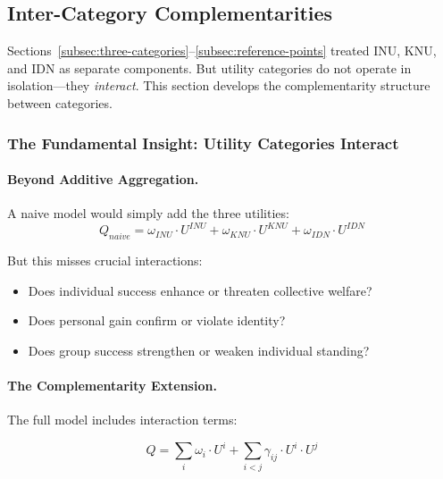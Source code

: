 \subsection{Inter-Category Complementarities}
\label{subsec:inter-category-complementarities}


Sections~\ref{subsec:three-categories}--\ref{subsec:reference-points} treated 
INU, KNU, and IDN as separate components. But utility categories do not operate 
in isolation---they \emph{interact}. This section develops the complementarity 
structure between categories.

\subsubsection{The Fundamental Insight: Utility Categories Interact}

\paragraph{Beyond Additive Aggregation.}
A naive model would simply add the three utilities:
\begin{equation}
Q_{naive} = \omega_{INU} \cdot U^{INU} + \omega_{KNU} \cdot U^{KNU} + \omega_{IDN} \cdot U^{IDN}
\end{equation}

But this misses crucial interactions:
\begin{itemize}
\item Does individual success enhance or threaten collective welfare?
\item Does personal gain confirm or violate identity?
\item Does group success strengthen or weaken individual standing?
\end{itemize}

\paragraph{The Complementarity Extension.}
The full model includes interaction terms:

\begin{equation}
\boxed{
Q = \sum_{i} \omega_i \cdot U^i + \sum_{i < j} \gamma_{ij} \cdot U^i \cdot U^j
}
\label{eq:complementarity-model}
\end{equation}

